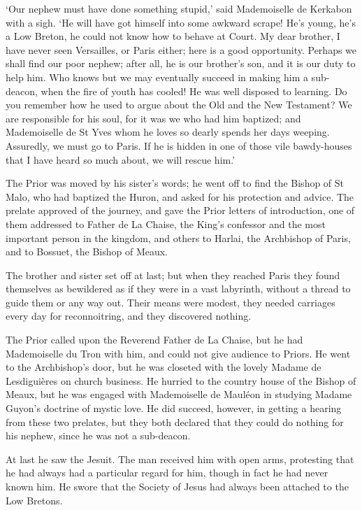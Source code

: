 \documentclass{article}
\begin{document}
\begin{center}
`Our nephew must have done something stupid,' said Mademoiselle de Kerkabon with 
a sigh. `He will have got himself into some awkward scrape! He's young, he's a 
Low Breton, he could not know how to behave at Court. My dear brother, I have never 
seen Versailles, or Paris either; here is a good opportunity. Perhaps we shall 
find our poor nephew; after all, he is our brother's son, and it is our duty to 
help him. Who knows but we may eventually succeed in making him a sub-deacon, when 
the fire of youth has cooled! He was well disposed to learning. Do you remember 
how he used to argue about the Old and the New Testament? We are responsible for 
his soul, for it was we who had him baptized; and Mademoiselle de St Yves whom 
he loves so dearly spends her days weeping. Assuredly, we must go to Paris. If 
he is hidden in one of those vile bawdy-houses that I have heard so much about, 
we will rescue him.' 

The Prior was moved by his sister's words; he went off to find the Bishop of St 
Malo, who had baptized the Huron, and asked for his protection and advice. The 
prelate approved of the journey, and gave the Prior letters of introduction, one 
of them addressed to Father de La Chaise, the King's confessor and the most important 
person in the kingdom, and others to Harlai, the Archbishop of Paris, and to Bossuet, 
the Bishop of Meaux. 

The brother and sister set off at last; but when they reached Paris they found 
themselves as bewildered as if they were in a vast labyrinth, without a thread 
to guide them or any way out. Their means were modest, they needed carriages every 
day for reconnoitring, and they discovered nothing. 

The Prior called upon the Reverend Father de La Chaise, but he had Mademoiselle 
du Tron with him, and could not give audience to Priors. He went to the Archbishop's 
door, but he was closeted with the lovely Madame de Lesdiguières on church business. 
He hurried to the country house of the Bishop of Meaux, but he was engaged with 
Mademoiselle de Mauléon in studying Madame Guyon's doctrine of mystic love. He 
did succeed, however, in getting a hearing from these two prelates, but they both 
declared that they could do nothing for his nephew, since he was not a sub-deacon. 

At last he saw the Jesuit. The man received him with open arms, protesting that 
he had always had a particular regard for him, though in fact he had never known 
him. He swore that the Society of Jesus had always been attached to the Low Bretons. 


\end{center}
\end{document}
